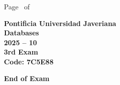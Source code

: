 \documentclass[11pt, addpoints, answers]{exam}\usepackage[utf8]{inputenc}
\begin{document}
\begin{coverpages}
\begin{center}
			\vspace{3mm}
			\leavevmode \hspace{5mm} 
		\end{center}
	\end{coverpages}

	\footer{} {Page \thepage\ of \numpages} {}

	\centering
	\textbf{\Large Pontificia Universidad Javeriana}\\
	\textbf{\Large Databases} \\
	\textbf{\large 2025 -- 10} \\
	\textbf{\large 3rd Exam} \\
	\textbf{Code: 7C5E88}


	\begin{questions}
		
		
		
		
		
		
		
		
		
		
		
		
		
		
		
		
		
		
		
		
	\end{questions}

	\vspace{5mm}
	\noindent \textbf{End of Exam}
\end{document}

